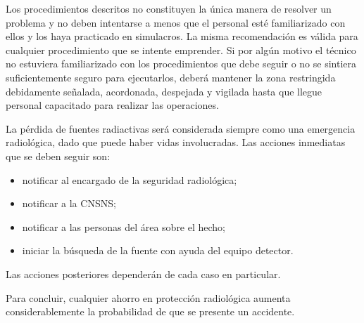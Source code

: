 Los procedimientos descritos no constituyen la única manera de resolver un problema y no deben intentarse a menos que el personal esté familiarizado con ellos y los haya practicado en simulacros. La misma recomendación es válida para cualquier procedimiento que se intente emprender. Si por algún motivo el técnico no estuviera familiarizado con los procedimientos que debe seguir o no se sintiera suficientemente seguro para ejecutarlos, deberá mantener la zona restringida debidamente señalada, acordonada, despejada y vigilada hasta que llegue personal capacitado para realizar las operaciones.

La pérdida de fuentes radiactivas será considerada siempre como una emergencia radiológica, dado que puede haber vidas involucradas. Las acciones inmediatas que se deben seguir son:
\begin{itemize}
  \item notificar al encargado de la seguridad radiológica;
  \item notificar a la CNSNS;
  \item notificar a las personas del área sobre el hecho;
  \item iniciar la búsqueda de la fuente con ayuda del equipo detector.
\end{itemize}

Las acciones posteriores dependerán de cada caso en particular.

Para concluir, cualquier ahorro en protección radiológica aumenta considerablemente la probabilidad de que se presente un accidente.
